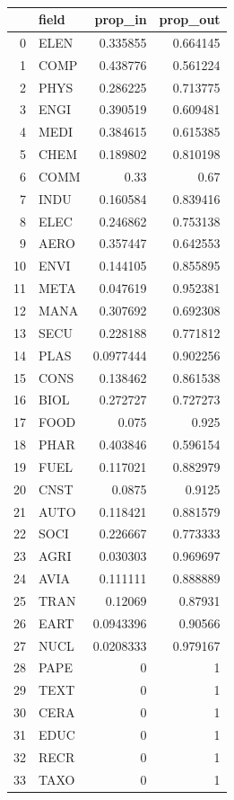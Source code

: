 \documentclass[12pt,letterpaper]{article}
\begin{document}
\begin{table}[]
\scriptsize
\centering
\begin{tabular}{rlrr}
\hline
   & field & prop\_in  & prop\_out \\ \hline
0  & ELEN  & 0.335855  & 0.664145  \\
1  & COMP  & 0.438776  & 0.561224  \\
2  & PHYS  & 0.286225  & 0.713775  \\
3  & ENGI  & 0.390519  & 0.609481  \\
4  & MEDI  & 0.384615  & 0.615385  \\
5  & CHEM  & 0.189802  & 0.810198  \\
6  & COMM  & 0.33      & 0.67      \\
7  & INDU  & 0.160584  & 0.839416  \\
8  & ELEC  & 0.246862  & 0.753138  \\
9  & AERO  & 0.357447  & 0.642553  \\
10 & ENVI  & 0.144105  & 0.855895  \\
11 & META  & 0.047619  & 0.952381  \\
12 & MANA  & 0.307692  & 0.692308  \\
13 & SECU  & 0.228188  & 0.771812  \\
14 & PLAS  & 0.0977444 & 0.902256  \\
15 & CONS  & 0.138462  & 0.861538  \\
16 & BIOL  & 0.272727  & 0.727273  \\
17 & FOOD  & 0.075     & 0.925     \\
18 & PHAR  & 0.403846  & 0.596154  \\
19 & FUEL  & 0.117021  & 0.882979  \\
20 & CNST  & 0.0875    & 0.9125    \\
21 & AUTO  & 0.118421  & 0.881579  \\
22 & SOCI  & 0.226667  & 0.773333  \\
23 & AGRI  & 0.030303  & 0.969697  \\
24 & AVIA  & 0.111111  & 0.888889  \\
25 & TRAN  & 0.12069   & 0.87931   \\
26 & EART  & 0.0943396 & 0.90566   \\
27 & NUCL  & 0.0208333 & 0.979167  \\
28 & PAPE  & 0         & 1         \\
29 & TEXT  & 0         & 1         \\
30 & CERA  & 0         & 1         \\
31 & EDUC  & 0         & 1         \\
32 & RECR  & 0         & 1         \\
33 & TAXO  & 0         & 1         \\ \hline
\end{tabular}
\caption{}
\label{tab:my-table}
\end{table}
\end{document}
